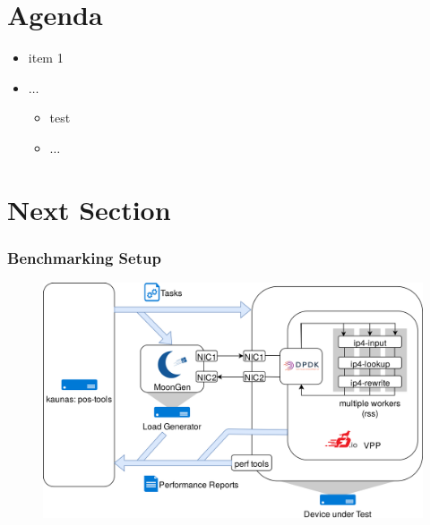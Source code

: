 \section{Agenda}

\begin{frame}
    \begin{itemize}
            \item item 1
            \item $\ldots$
            \begin{itemize}
                \item test
                \item $\ldots$
            \end{itemize}
        \end{itemize}
\end{frame}

\section{Next Section}

\begin{frame}
    \frametitle{Benchmarking Setup}
    \begin{figure}
    \noindent\hspace{1mm}\includegraphics[width=\linewidth]{pics/topology.png}
    \label{setup}
    \end{figure}
\end{frame}


